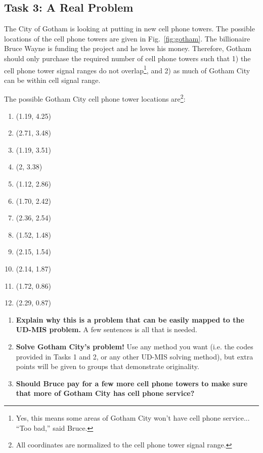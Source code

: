 \documentclass[12pt]{article}
\begin{document}
\subsection*{Task 3: A Real Problem}

The City of Gotham is looking at putting in new cell phone towers.
The possible locations of the cell phone towers are given in Fig.~\ref{fig:gotham}.
The billionaire Bruce Wayne is funding the project and he loves his money. 
Therefore, Gotham should only purchase the required number of cell phone towers such that 1) the cell phone tower signal ranges do not overlap\footnote{Yes, this means some areas of Gotham City won't have cell phone service... ``Too bad,'' said Bruce.}, and 2) as much of Gotham City can be within cell signal range. 

The possible Gotham City cell phone tower locations are\footnote{All coordinates are normalized to the cell phone tower signal range.}:
\begin{enumerate}
	\item (1.19, 4.25)
	\item (2.71, 3.48)
	\item (1.19, 3.51)
	\item (2, 3.38)
	\item (1.12, 2.86)
	\item (1.70, 2.42)
	\item (2.36, 2.54)
	\item (1.52, 1.48)
	\item (2.15, 1.54)
	\item (2.14, 1.87)
	\item (1.72, 0.86)
	\item (2.29, 0.87)
\end{enumerate}

\begin{enumerate}
	\item {\bf Explain why this is a problem that can be easily mapped to the UD-MIS problem.} A few sentences is all that is needed.
	\item {\bf Solve Gotham City's problem!} Use any method you want (i.e. the codes provided in Tasks 1 and 2, or any other UD-MIS solving method), but extra points will be given to groups that demonstrate originality.
	\item {\bf Should Bruce pay for a few more cell phone towers to make sure that more of Gotham City has cell phone service?}
\end{enumerate}
\end{document}
